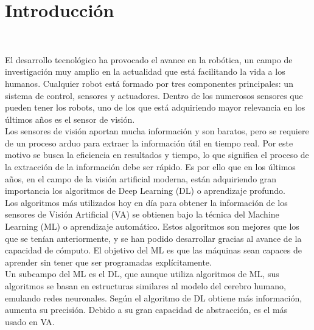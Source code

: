 \chapter{Introducción}
\label{cap:capitulo1}
\setcounter{page}{1}

\begin{flushright}
\begin{minipage}[]{10cm}
\end{minipage}\\

\end{flushright}

\vspace{1cm}

El desarrollo tecnológico ha provocado el avance en la robótica, un campo de investigación muy amplio en la actualidad que está facilitando la vida a los humanos. Cualquier robot está formado por tres componentes principales: un sistema de control, sensores y actuadores. Dentro de los numerosos sensores que pueden tener los robots, uno de los que está adquiriendo mayor relevancia en los últimos años es el sensor de visión.\\

Los sensores de visión aportan mucha información y son baratos, pero se requiere de un proceso arduo para extraer la información útil en tiempo real. Por este motivo se busca la eficiencia en resultados y tiempo, lo que significa el proceso de la extracción de la información debe ser rápido. Es por ello que en los últimos años, en el campo de la visión artificial moderna, están adquiriendo gran importancia los algoritmos de Deep Learning (DL) o aprendizaje profundo.\\

Los algoritmos más utilizados hoy en día para obtener la información de los sensores de Visión Artificial (VA) se obtienen bajo la técnica del Machine Learning (ML) o aprendizaje automático. Estos algoritmos son mejores que los que se tenían anteriormente, y se han podido desarrollar gracias al avance de la capacidad de cómputo. El objetivo del ML es que las máquinas sean capaces de aprender sin tener que ser programadas explícitamente.\\

Un subcampo del ML es el DL, que aunque utiliza algoritmos de ML, sus algoritmos se basan en estructuras similares al modelo del cerebro humano, emulando redes neuronales. Según el algoritmo de DL obtiene más información, aumenta su precisión. Debido a su gran capacidad de abstracción, es el más usado en VA.\\

